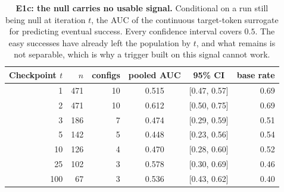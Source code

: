 \begin{table}[t]
    \centering
    \begin{tabular}{@{}rrrccr@{}}
        \toprule
        \textbf{Checkpoint $t$} & $n$ & \textbf{configs} & \textbf{pooled AUC} & \textbf{95\% CI} & \textbf{base rate} \\
        \midrule
        1   & 471 & 10 & 0.515 & [0.47, 0.57] & 0.69 \\
        2   & 471 & 10 & 0.612 & [0.50, 0.75] & 0.69 \\
        3   & 186 & 7  & 0.474 & [0.29, 0.59] & 0.51 \\
        5   & 142 & 5  & 0.448 & [0.23, 0.56] & 0.54 \\
        10  & 126 & 4  & 0.470 & [0.28, 0.60] & 0.52 \\
        25  & 102 & 3  & 0.578 & [0.30, 0.69] & 0.46 \\
        100 & 67  & 3  & 0.536 & [0.43, 0.62] & 0.40 \\
        \bottomrule
    \end{tabular}
    \caption{\textbf{E1c: the null carries no usable signal.} Conditional on a run still being null
    at iteration $t$, the AUC of the continuous target-token surrogate for predicting eventual
    success. Every confidence interval covers $0.5$. The easy successes have already left the
    population by $t$, and what remains is not separable, which is why a trigger built on this
    signal cannot work.}
    \label{tab:e1c_auc}
\end{table}
